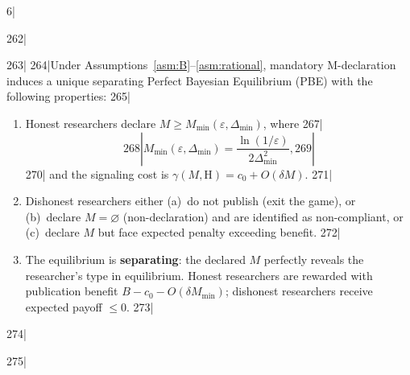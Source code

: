 6|\documentclass[12pt,a4paper]{article}
\begin{document}
262|\begin{theorem}
263|\label{thm:separating}
264|Under Assumptions~\ref{asm:B}--\ref{asm:rational}, mandatory M-declaration induces a unique separating Perfect Bayesian Equilibrium (PBE) with the following properties:
265|\begin{enumerate}[label=(\roman*)]
266|    \item Honest researchers declare $M \ge M_{\min}(\varepsilon, \Delta_{\min})$, where
267|    \begin{equation}\label{eq:Mmin}
268|        M_{\min}(\varepsilon, \Delta_{\min}) = \frac{\ln(1/\varepsilon)}{2\Delta_{\min}^2},
269|    \end{equation}
270|    and the signaling cost is $\gamma(M, \text{H}) = c_0 + O(\delta M)$.
271|    \item Dishonest researchers either (a)~do not publish (exit the game), or (b)~declare $M = \varnothing$ (non-declaration) and are identified as non-compliant, or (c)~declare $M$ but face expected penalty exceeding benefit.
272|    \item The equilibrium is \textbf{separating}: the declared $M$ perfectly reveals the researcher's type in equilibrium. Honest researchers are rewarded with publication benefit $B - c_0 - O(\delta M_{\min})$; dishonest researchers receive expected payoff $\le 0$.
273|\end{enumerate}
274|\end{theorem}
275|
\end{document}
